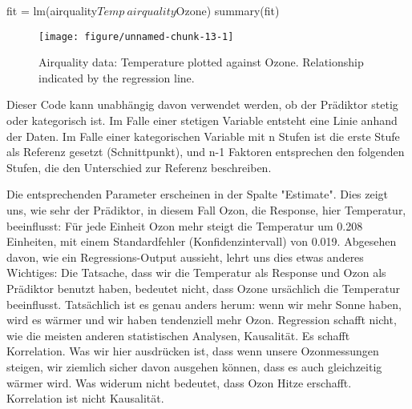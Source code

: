\documentclass[a4paper,twoside]{tufte-book}\usepackage[]{graphicx}\usepackage[]{color}
\makeatletter
\def\maxwidth{ %
	\ifdim\Gin@nat@width>\linewidth
	\linewidth
	\else
	\Gin@nat@width
	\fi
}
\makeatother
\begin{document}
\begin{Schunk}
\begin{Sinput}
fit = lm(airquality$Temp~airquality$Ozone)
summary(fit)
\end{Sinput}
\end{Schunk}

\begin{figure}[htbp]
\begin{center}
\begin{Schunk}

\texttt{[image: figure/unnamed-chunk-13-1]} \end{Schunk}
\caption{Airquality data: Temperature plotted against Ozone. Relationship indicated by the regression line.}
\label{fig: LR}
\end{center}
\end{figure}

Dieser Code kann unabhängig davon verwendet werden, ob der Prädiktor stetig oder kategorisch ist. Im Falle einer stetigen Variable entsteht eine Linie anhand der Daten. Im Falle einer kategorischen Variable mit n Stufen ist die erste Stufe als Referenz gesetzt (Schnittpunkt), und n-1 Faktoren entsprechen den folgenden Stufen, die den Unterschied zur Referenz beschreiben.

Die entsprechenden Parameter erscheinen in der Spalte "Estimate". Dies zeigt uns, wie sehr der Prädiktor, in diesem Fall Ozon, die Response, hier Temperatur, beeinflusst: Für jede Einheit Ozon mehr steigt die Temperatur um 0.208 Einheiten, mit einem Standardfehler (Konfidenzintervall) von 0.019. Abgesehen davon, wie ein Regressions-Output aussieht, lehrt uns dies etwas anderes Wichtiges: Die Tatsache, dass wir die Temperatur als Response und Ozon als Prädiktor benutzt haben, bedeutet nicht, dass Ozone ursächlich die Temperatur beeinflusst. Tatsächlich ist es genau anders herum: wenn wir mehr Sonne haben, wird es wärmer und wir haben tendenziell mehr Ozon. Regression schafft nicht, wie die meisten anderen statistischen Analysen, Kausalität. Es schafft Korrelation. Was wir hier ausdrücken ist, dass wenn unsere Ozonmessungen steigen, wir ziemlich sicher davon ausgehen können, dass es auch gleichzeitig wärmer wird. Was widerum nicht bedeutet, dass Ozon Hitze erschafft. Korrelation ist nicht Kausalität.
\end{document}

